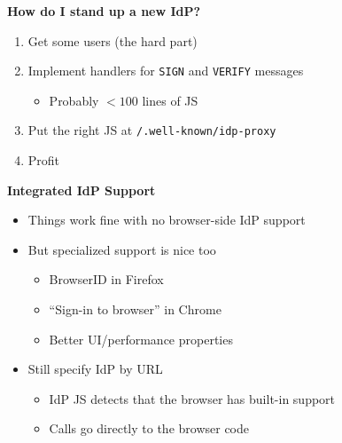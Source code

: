\documentclass[helvetica]{seminar}
\newcommand{\heading}[1]{%
  \begin{center} 
    \large\bf 
    #1 
  \end{center} 
  \vspace{.4 in}}
\begin{document}
\begin{slide}
\heading{How do I stand up a new IdP?}

\begin{enumerate}
\item Get some users (the hard part)
\item Implement handlers for \verb^SIGN^ and \verb^VERIFY^ messages
  \begin{itemize}
  \item Probably $<100$ lines of JS
  \end{itemize}

\item Put the right JS at \verb^/.well-known/idp-proxy^
\item Profit
\end{enumerate}
\end{slide}


\begin{slide}
\heading{Integrated IdP Support}

\begin{itemize}
\item Things work fine with no browser-side IdP support
\item But specialized support is nice too
  \begin{itemize}
  \item BrowserID in Firefox
  \item ``Sign-in to browser'' in Chrome
  \item Better UI/performance properties
  \end{itemize}

\item Still specify IdP by URL
  \begin{itemize}
  \item IdP JS detects that the browser has built-in support
  \item Calls go directly to the browser code
  \end{itemize}
\end{itemize}

\end{slide}
\end{document}
